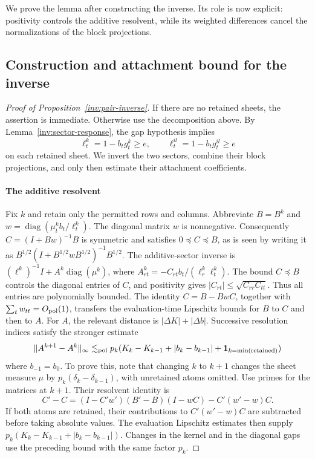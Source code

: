 We prove the lemma after constructing the inverse. Its role is now
explicit: positivity controls the additive resolvent, while its weighted
differences cancel the normalizations of the block projections.

\subsection{Construction and attachment bound for the inverse}

\begin{proof}[Proof of Proposition~\ref{inv:pair-inverse}]
If there are no retained sheets, the assertion is immediate. Otherwise
use the decomposition above. By Lemma~\ref{inv:sector-response}, the
gap hypothesis implies
\[
 \ell_t^k=1-b_tg_t^k\ge e,\qquad
 \ell_t^{il}=1-b_tg_t^{il}\ge e
\]
on each retained sheet. We invert the two sectors, combine their block
projections, and only then estimate their attachment coefficients.

\paragraph{The additive resolvent}
Fix \(k\) and retain only the permitted rows and columns. Abbreviate
\(B=B^k\) and
\(w=\operatorname{diag}(\mu_t^k b_t/\ell_t^k)\).
The diagonal matrix \(w\) is nonnegative. Consequently
\(C=(I+B w)^{-1}B\) is symmetric and satisfies
\(0\preceq C\preceq B\), as is seen by writing it as
\(B^{1/2}(I+B^{1/2}wB^{1/2})^{-1}B^{1/2}\).
The additive-sector inverse is
\((\ell^k)^{-1}I+A^k\operatorname{diag}(\mu^k)\), where
\(A^k_{rt}=-C_{rt}b_t/(\ell_r^k\ell_t^k)\).
The bound \(C\preceq B\) controls the diagonal entries of \(C\), and
positivity gives \(|C_{rt}|\le\sqrt{C_{rr}C_{tt}}\). Thus all entries
are polynomially bounded. The identity \(C=B-BwC\), together with
\(\sum_t w_{tt}=O_{\rm pol}(1)\), transfers the evaluation-time
Lipschitz bounds for \(B\) to \(C\) and then to \(A\). For \(A\),
the relevant distance is \(|\Delta K|+|\Delta b|\).
Successive resolution indices satisfy the stronger estimate
\[
 \|A^{k+1}-A^k\|_\infty\lesssim_{\rm pol}
 p_k(K_k-K_{k-1}+|b_k-b_{k-1}|+{\bf1}_{k=\min(\mathrm{retained})})
\]
where \(b_{-1}=b_0\). To prove this, note that changing \(k\) to
\(k+1\) changes the sheet measure \(\mu\) by
\(p_k(\delta_k-\delta_{k-1})\), with unretained atoms omitted.
Use primes for the matrices at \(k+1\). Their resolvent identity is
\[
 C'-C=(I-C'w')(B'-B)(I-wC)-C'(w'-w)C .
\]
If both atoms are retained, their contributions to
\(C'(w'-w)C\) are subtracted before taking absolute values. The
evaluation Lipschitz estimates then supply
\(p_k(K_k-K_{k-1}+|b_k-b_{k-1}|)\). Changes in the kernel and in the
diagonal gaps use the preceding bound with the same factor \(p_k\).


\end{proof}
